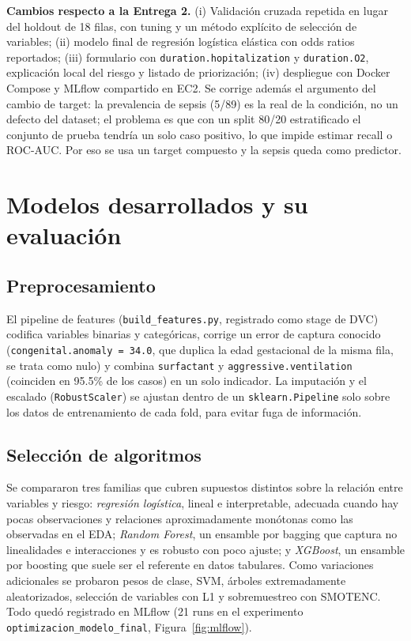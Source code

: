 \documentclass{llncs}
\begin{document}
\textbf{Cambios respecto a la Entrega 2.} (i) Validación cruzada repetida en
lugar del holdout de 18 filas, con tuning y un método explícito de selección de
variables; (ii) modelo final de regresión logística elástica con odds ratios
reportados; (iii) formulario con \texttt{duration.hopitalization} y
\texttt{duration.O2}, explicación local del riesgo y listado de priorización;
(iv) despliegue con Docker Compose y MLflow compartido en EC2. Se corrige además
el argumento del cambio de target: la prevalencia de sepsis (5/89) es la real de
la condición, no un defecto del dataset; el problema es que con un split 80/20
estratificado el conjunto de prueba tendría un solo caso positivo, lo que
impide estimar recall o ROC-AUC. Por eso se usa un target compuesto y la sepsis
queda como predictor.

\section{Modelos desarrollados y su evaluación}

\subsection{Preprocesamiento}

El pipeline de features (\texttt{build\_features.py}, registrado como stage de
DVC) codifica variables binarias y categóricas, corrige un error
de captura conocido (\texttt{congenital.anomaly = 34.0}, que duplica la edad
gestacional de la misma fila, se trata como nulo) y combina
\texttt{surfactant} y \texttt{aggressive.ventilation} (coinciden en 95.5\% de
los casos) en un solo indicador. La imputación y el escalado
(\texttt{RobustScaler}) se ajustan dentro de un \texttt{sklearn.Pipeline} solo
sobre los datos de entrenamiento de cada fold, para evitar fuga de información.

\subsection{Selección de algoritmos}

Se compararon tres familias que cubren supuestos distintos sobre la relación
entre variables y riesgo:
\emph{regresión logística}, lineal e interpretable, adecuada cuando hay pocas
observaciones y relaciones aproximadamente monótonas como las observadas en el
EDA;
\emph{Random Forest}, un ensamble por bagging que captura no linealidades e
interacciones y es robusto con poco ajuste;
y \emph{XGBoost}, un ensamble por boosting que suele ser el referente en datos
tabulares. Como variaciones adicionales se probaron pesos de clase, SVM, árboles
extremadamente aleatorizados, selección de variables con L1 y sobremuestreo con
SMOTENC. Todo quedó registrado en MLflow (21 runs en el experimento
\texttt{optimizacion\_modelo\_final}, Figura~\ref{fig:mlflow}).
\end{document}
